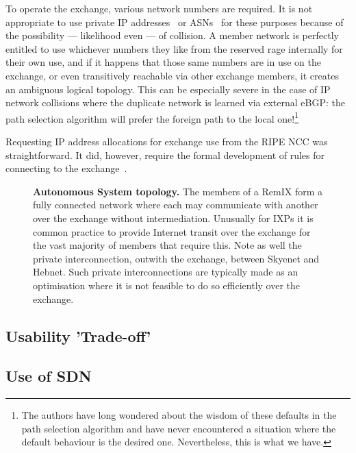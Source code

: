 To operate the exchange, various network numbers are required. It is
not appropriate to use private IP addresses~\cite{rfc1918}
or \acp{ASN}~\cite{rfc6996} for these purposes because of the
possibility --- likelihood even --- of collision. A member network is
perfectly entitled to use whichever numbers they like from the
reserved rage internally for their own use, and if it happens that
those same numbers are in use on the exchange, or even transitively
reachable via other exchange members, it creates an ambiguous logical
topology. This can be especially severe in the case of IP network
collisions where the duplicate network is learned via external eBGP:
the path selection algorithm will prefer the foreign path to the local
one!\footnote{The authors have long wondered about the wisdom of these
defaults in the path selection algorithm and have never encountered a
situation where the default behaviour is the desired
one. Nevertheless, this is what we have.}

Requesting IP address allocations for exchange use from the RIPE NCC
was straightforward. It did, however, require the formal development
of rules for connecting to the exchange~\cite{whixrules}.


\begin{figure}[h]
  \resizebox{\linewidth}{!}{
    \begin{tikzpicture}
      \whixtopodiagram
    \end{tikzpicture}
  }
  \caption{
  \textbf{Autonomous System topology.} The members of a RemIX form a fully connected network where each may communicate
  with another over the exchange without intermediation. Unusually for \acp{IXP} it is common practice to provide Internet transit over the exchange for the vast majority of members that require this. Note as
  well the private interconnection, outwith the exchange, between Skyenet
  and Hebnet. Such private interconnections are typically made as
  an optimisation where it is not feasible to do so efficiently over the exchange.
  }
\end{figure}



\subsection{Usability 'Trade-off'} \label{subsec:use}


\subsection{Use of SDN}
